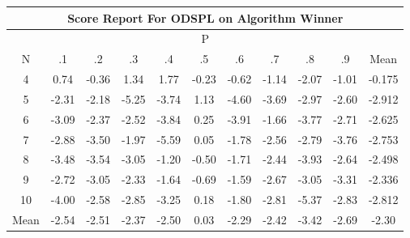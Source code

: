 \documentclass[11pt,a4paper]{report}
\begin{document}
\begin{longtable}{ | c || c | c | c | c | c | c | c | c | c || c |}
\hline
\multicolumn{11}{|c|}{ Score Report For ODSPL on Algorithm Winner} \\
\hline
\multicolumn{11}{|c|}{ P } \\
\hline
N & .1 & .2 & .3 & .4 & .5 & .6 & .7 & .8 & .9 & Mean\\
 \hline
 \hline
 \endhead
  4 &  \cellcolor[HTML]{EFEFFF} 0.74 &  \cellcolor[HTML]{FFF7F7} -0.36 &  \cellcolor[HTML]{DFDFFF} 1.34 &  \cellcolor[HTML]{CFCFFF} 1.77 &  \cellcolor[HTML]{FFF7F7} -0.23 &  \cellcolor[HTML]{FFEFEF} -0.62 &  \cellcolor[HTML]{FFDFDF} -1.14 &  \cellcolor[HTML]{FFC7C7} -2.07 &  \cellcolor[HTML]{FFE7E7} -1.01 & -0.175 \\
  5 &  \cellcolor[HTML]{FFC7C7} -2.31 &  \cellcolor[HTML]{FFC7C7} -2.18 &  \cellcolor[HTML]{FF7878} -5.25 &  \cellcolor[HTML]{FF9F9F} -3.74 &  \cellcolor[HTML]{DFDFFF} 1.13 &  \cellcolor[HTML]{FF8F8F} -4.60 &  \cellcolor[HTML]{FF9F9F} -3.69 &  \cellcolor[HTML]{FFB7B7} -2.97 &  \cellcolor[HTML]{FFBFBF} -2.60 & -2.912 \\
  6 &  \cellcolor[HTML]{FFAFAF} -3.09 &  \cellcolor[HTML]{FFC7C7} -2.37 &  \cellcolor[HTML]{FFBFBF} -2.52 &  \cellcolor[HTML]{FF9F9F} -3.84 &  \cellcolor[HTML]{F7F7FF} 0.25 &  \cellcolor[HTML]{FF9F9F} -3.91 &  \cellcolor[HTML]{FFD7D7} -1.66 &  \cellcolor[HTML]{FF9F9F} -3.77 &  \cellcolor[HTML]{FFB7B7} -2.71 & -2.625 \\
  7 &  \cellcolor[HTML]{FFB7B7} -2.88 &  \cellcolor[HTML]{FFA7A7} -3.50 &  \cellcolor[HTML]{FFCFCF} -1.97 &  \cellcolor[HTML]{FF7070} -5.59 &  \cellcolor[HTML]{FFFFFF} 0.05 &  \cellcolor[HTML]{FFCFCF} -1.78 &  \cellcolor[HTML]{FFBFBF} -2.56 &  \cellcolor[HTML]{FFB7B7} -2.79 &  \cellcolor[HTML]{FF9F9F} -3.76 & -2.753 \\
  8 &  \cellcolor[HTML]{FFA7A7} -3.48 &  \cellcolor[HTML]{FFA7A7} -3.54 &  \cellcolor[HTML]{FFAFAF} -3.05 &  \cellcolor[HTML]{FFDFDF} -1.20 &  \cellcolor[HTML]{FFEFEF} -0.50 &  \cellcolor[HTML]{FFD7D7} -1.71 &  \cellcolor[HTML]{FFBFBF} -2.44 &  \cellcolor[HTML]{FF9F9F} -3.93 &  \cellcolor[HTML]{FFBFBF} -2.64 & -2.498 \\
  9 &  \cellcolor[HTML]{FFB7B7} -2.72 &  \cellcolor[HTML]{FFAFAF} -3.05 &  \cellcolor[HTML]{FFC7C7} -2.33 &  \cellcolor[HTML]{FFD7D7} -1.64 &  \cellcolor[HTML]{FFEFEF} -0.69 &  \cellcolor[HTML]{FFD7D7} -1.59 &  \cellcolor[HTML]{FFBFBF} -2.67 &  \cellcolor[HTML]{FFAFAF} -3.05 &  \cellcolor[HTML]{FFAFAF} -3.31 & -2.336 \\
  10 &  \cellcolor[HTML]{FF9797} -4.00 &  \cellcolor[HTML]{FFBFBF} -2.58 &  \cellcolor[HTML]{FFB7B7} -2.85 &  \cellcolor[HTML]{FFAFAF} -3.25 &  \cellcolor[HTML]{F7F7FF} 0.18 &  \cellcolor[HTML]{FFCFCF} -1.80 &  \cellcolor[HTML]{FFB7B7} -2.81 &  \cellcolor[HTML]{FF7878} -5.37 &  \cellcolor[HTML]{FFB7B7} -2.83 & -2.812 \\
 \hline
 \hline
Mean &  \cellcolor[HTML]{FFBFBF} -2.54 &  \cellcolor[HTML]{FFBFBF} -2.51 &  \cellcolor[HTML]{FFC7C7} -2.37 &  \cellcolor[HTML]{FFBFBF} -2.50 &  \cellcolor[HTML]{FFFFFF} 0.03 &  \cellcolor[HTML]{FFC7C7} -2.29 &  \cellcolor[HTML]{FFBFBF} -2.42 &  \cellcolor[HTML]{FFA7A7} -3.42 &  \cellcolor[HTML]{FFBFBF} -2.69 &  \cellcolor[HTML]{FFC7C7} -2.30
\end{longtable}
\end{document}
